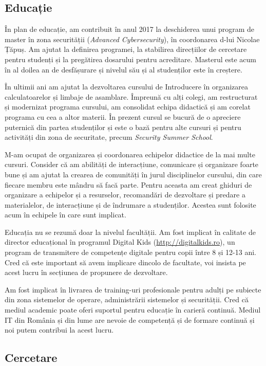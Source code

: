 \documentclass[11pt,a4paper]{article}
\begin{document}
\subsection*{Educație}

În plan de educație, am contribuit în anul 2017 la deschiderea unui program de master în zona securității (\textit{Advanced Cybersecurity}), în coordonarea d-lui Nicolae Țăpuș. Am ajutat la definirea programei, la stabilirea direcțiilor de cercetare pentru studenți și la pregătirea dosarului pentru acreditare. Masterul este acum în al doilea an de desfășurare și nivelul său și al studenților este în creștere.

În ultimii ani am ajutat la dezvoltarea cursului de Introducere în organizarea calculatoarelor și limbaje de asamblare. Împreună cu alți colegi, am restructurat și modernizat programa cursului, am consolidat echipa didactică și am corelat programa cu cea a altor materii. În prezent cursul se bucură de o apreciere puternică din partea studenților și este o bază pentru alte cursuri și pentru activități din zona de securitate, precum \textit{Security Summer School}.

M-am ocupat de organizarea și coordonarea echipelor didactice de la mai multe cursuri. Consider că am abilități de interacțiune, comunicare și organizare foarte bune și am ajutat la crearea de comunități în jurul disciplinelor cursului, din care fiecare membru este mândru să facă parte. Pentru aceasta am creat ghiduri de organizare a echipelor și a resurselor, recomandări de dezvoltare și predare a materialelor, de interacțiune și de îndrumare a studenților. Acestea sunt folosite acum în echipele în care sunt implicat.

Educația nu se rezumă doar la nivelul facultății. Am fost implicat în calitate de director educațional în programul Digital Kids (\url{http://digitalkids.ro}), un program de transmitere de competențe digitale pentru copii între 8 și 12-13 ani. Cred că este important să avem implicare dincolo de facultate, voi insista pe acest lucru în secțiunea de propunere de dezvoltare.

Am fost implicat în livrarea de training-uri profesionale pentru adulți pe subiecte din zona sistemelor de operare, administrării sistemelor și securității. Cred că mediul academic poate oferi suportul pentru educație în carieră continuă. Mediul IT din România și din lume are nevoie de competență și de formare continuă și noi putem contribui la acest lucru.

\subsection*{Cercetare}
\end{document}
